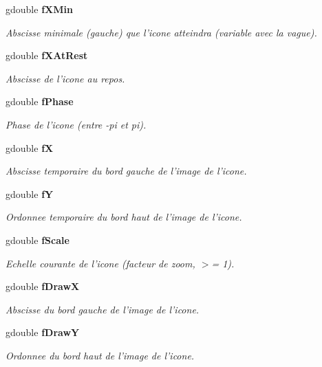 \begin{CompactItemize}
gdouble {\bf fXMin}
\begin{CompactList}\small\item\em Abscisse minimale (gauche) que l'icone atteindra (variable avec la vague). \item\end{CompactList}\item 
gdouble {\bf fXAtRest}
\begin{CompactList}\small\item\em Abscisse de l'icone au repos. \item\end{CompactList}\item 
gdouble {\bf fPhase}
\begin{CompactList}\small\item\em Phase de l'icone (entre -pi et pi). \item\end{CompactList}\item 
gdouble {\bf fX}
\begin{CompactList}\small\item\em Abscisse temporaire du bord gauche de l'image de l'icone. \item\end{CompactList}\item 
gdouble {\bf fY}
\begin{CompactList}\small\item\em Ordonnee temporaire du bord haut de l'image de l'icone. \item\end{CompactList}\item 
gdouble {\bf fScale}
\begin{CompactList}\small\item\em Echelle courante de l'icone (facteur de zoom, $>$= 1). \item\end{CompactList}\item 
gdouble {\bf fDrawX}
\begin{CompactList}\small\item\em Abscisse du bord gauche de l'image de l'icone. \item\end{CompactList}\item 
gdouble {\bf fDrawY}
\begin{CompactList}\small\item\em Ordonnee du bord haut de l'image de l'icone. \item\end{CompactList}\item 

\end{CompactItemize}
